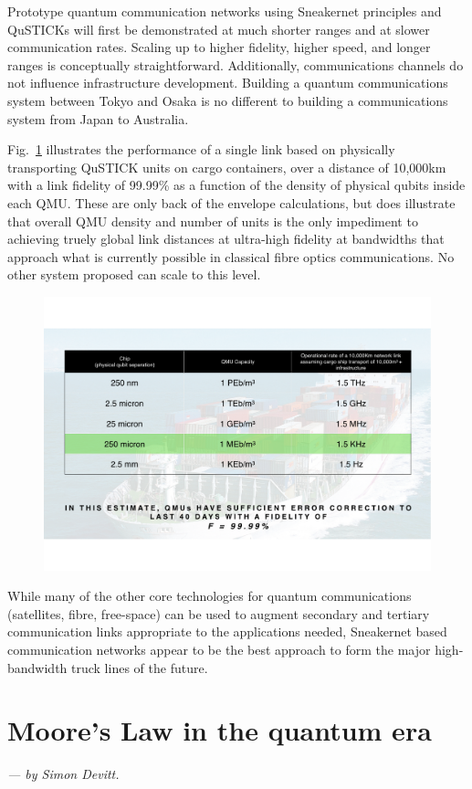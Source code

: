 \documentclass[twocolumn, aps, rmp, amsmath, amssymb, nofootinbib, superscriptaddress, longbibliography, floatfix, table-of-contents, eqsecnum]{revtex4-2}
\newcommand{\sectionby}[1]{\begin{center}\textit{--- by #1.}\end{center}}
\newcommand{\comment}[1]{{\color{blue}{\textbf{#1}}}}
\begin{document}
Prototype quantum communication networks using Sneakernet principles and QuSTICKs will first be demonstrated at much shorter ranges and at slower communication rates. Scaling up to higher fidelity, higher speed, and longer ranges is conceptually straightforward. Additionally, communications channels do not influence infrastructure development. Building a quantum communications system between Tokyo and Osaka is no different to building a communications system from Japan to Australia. 

Fig.~\ref{fig:link} illustrates the performance of a single link based on physically transporting QuSTICK units on cargo containers, over a distance of 10,000km with a link fidelity of 99.99\% as a function of the density of physical qubits inside each QMU. These are only back of the envelope calculations, but does illustrate that overall QMU density and number of units is the only impediment to achieving truely global link distances at ultra-high fidelity at bandwidths that approach what is currently possible in classical fibre optics communications. No other system proposed can scale to this level.
 
\begin{figure}[htbp!]
	\includegraphics[clip=true, width=\columnwidth]{link}
	\caption{} \label{fig:link}
\end{figure}

While many of the other core technologies for quantum communications (satellites, fibre, free-space) can be used to augment secondary and tertiary communication links appropriate to the applications needed, Sneakernet based communication networks appear to be the best approach to form the major high-bandwidth truck lines of the future. 

\section{Moore's Law in the quantum era}

\sectionby{Simon Devitt}

\comment{To do}



\printindex
\end{document}
